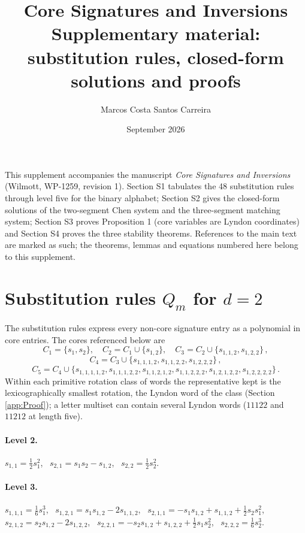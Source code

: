 \documentclass[11pt,english]{article}
\theoremstyle{definition}
\theoremstyle{remark}
\begin{document}
\title{Core Signatures and Inversions\\ \large Supplementary material: substitution rules, closed-form solutions and proofs}
\author{Marcos Costa Santos Carreira}
\date{September 2026}
\maketitle
\noindent This supplement accompanies the manuscript \emph{Core Signatures and
Inversions} (Wilmott, WP-1259, revision 1). Section S1 tabulates the 48
substitution rules through level five for the binary alphabet; Section S2
gives the closed-form solutions of the two-segment Chen system and the
three-segment matching system; Section S3 proves Proposition 1 (core
variables are Lyndon coordinates) and Section S4 proves the three
stability theorems. References to the main text are marked as such;
the theorems, lemmas and equations numbered here belong to this
supplement.
\renewcommand{\thesection}{S\arabic{section}}
\renewcommand{\theequation}{S\arabic{section}.\arabic{equation}}
\makeatletter\renewcommand{\@seccntformat}[1]{\csname the#1\endcsname.\quad}\makeatother
\section{Substitution rules \texorpdfstring{$Q_{m}$}{Qm} for \texorpdfstring{$d=2$}{d=2}\label{app:Q}}

The substitution rules express every non-core signature entry as a
polynomial in core entries. The cores referenced below are
\[
C_{1}=\{s_{1},s_{2}\},\quad C_{2}=C_{1}\cup\{s_{1,2}\},\quad C_{3}=C_{2}\cup\{s_{1,1,2},s_{1,2,2}\}\,,
\]
\[
C_{4}=C_{3}\cup\{s_{1,1,1,2},s_{1,1,2,2},s_{1,2,2,2}\}\,,
\]
\[
C_{5}=C_{4}\cup\{s_{1,1,1,1,2},s_{1,1,1,2,2},s_{1,1,2,1,2},s_{1,1,2,2,2},s_{1,2,1,2,2},s_{1,2,2,2,2}\}\,.
\]
Within each primitive rotation class of words the representative kept
is the lexicographically smallest rotation, the Lyndon word of the
class (Section \ref{app:Proof}); a letter multiset can contain several Lyndon
words ($11122$ and $11212$ at length five).

\paragraph{Level 2.}
$s_{1,1}=\tfrac{1}{2}s_{1}^{2}$, \ $s_{2,1}=s_{1}s_{2}-s_{1,2}$,
\ $s_{2,2}=\tfrac{1}{2}s_{2}^{2}$.

\paragraph{Level 3.}
$s_{1,1,1}=\tfrac{1}{6}s_{1}^{3}$, \ $s_{1,2,1}=s_{1}s_{1,2}-2s_{1,1,2}$,
\ $s_{2,1,1}=-s_{1}s_{1,2}+s_{1,1,2}+\tfrac{1}{2}s_{2}s_{1}^{2}$,
\ $s_{2,1,2}=s_{2}s_{1,2}-2s_{1,2,2}$, \ $s_{2,2,1}=-s_{2}s_{1,2}+s_{1,2,2}+\tfrac{1}{2}s_{1}s_{2}^{2}$,
\ $s_{2,2,2}=\tfrac{1}{6}s_{2}^{3}$.
\end{document}
